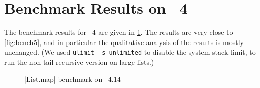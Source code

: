\section{Benchmark Results on \OCaml~4}

The benchmark results for \OCaml~4 are given in \cref{fig:bench4}. The
results are very close to \cref{fig:bench5}, and in particular the
qualitative analysis of the results is mostly unchanged. (We used
\texttt{ulimit -s unlimited} to disable the system stack limit, to run
the non-tail-recursive version on large lists.)

\begin{figure}[tp]
\def\svgscale{0.8}
\graphicspath{{plots/}}

\caption{\ocaml|List.map| benchmark on \OCaml~4.14}
\label{fig:bench4}
\end{figure}

